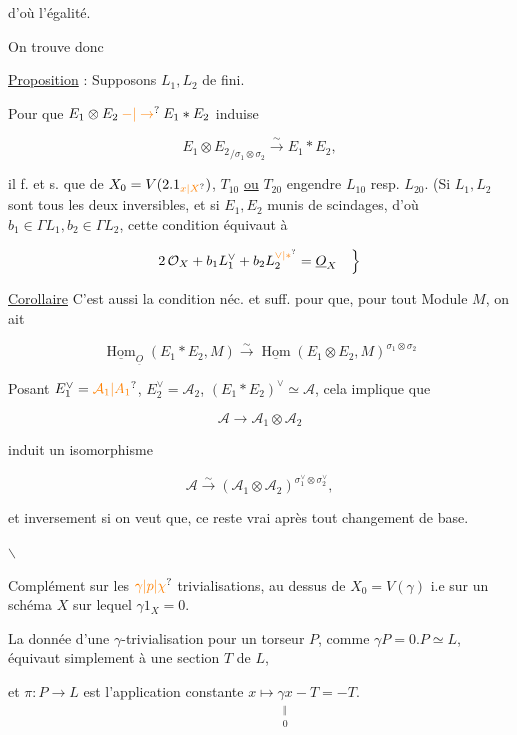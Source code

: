 d'où l'égalité.

On trouve donc

\uline{Proposition} : Supposons  $L_1,L_2$ de   fini.

Pour que $E_1\otimes E_2\mathbin{\unsure{-|\to}}E_1*E_2$ induise

\[ {E_1\otimes E_2}_{/\sigma_1\otimes\sigma_2}\xrightarrow{\sim}E_1*E_2, \]

il f. et s. que    de $X_0=V(2.1_{\unsure{x|X}})$, $T_{10}$ \uline{ou} $T_{20}$ engendre $L_{10}$ resp. $L_{20}$. (Si $L_1,L_2$ sont tous les deux inversibles, et si $E_1,E_2$ munis de scindages, d'où $b_1\in\Gamma L_1,b_2\in\Gamma L_2$, cette condition équivaut à

\[ 2\,\mathcal O_X+b_1L_1^\vee+b_2 L_2^{\unsure{\vee|*}}=\underline O_X\quad\Bigr\} \]


\uline{Corollaire} C'est aussi la condition néc. et suff. pour que, pour tout Module $M$, on ait

\[ \underline{\operatorname{Hom}}_{\underline O}(E_1*E_2,M)\xrightarrow{\sim}\underline{\operatorname{Hom}}(E_1\otimes E_2,M)^{\sigma_1\otimes\sigma_2} \]

Posant $E_1^\vee=\unsure{\mathcal A_1|A_1}$, $E_2^\vee=\mathcal A_2$, $(E_1*E_2)^\vee\simeq\mathcal A$, cela implique que

\[ \mathcal A\longrightarrow\mathcal A_1\otimes\mathcal A_2 \]

induit un isomorphisme

\[ \mathcal A\xrightarrow{\sim}(\mathcal A_1\otimes\mathcal A_2)^{\sigma_1^\vee\otimes\sigma_2^\vee}, \]

et inversement si on veut que, ce  reste vrai après tout changement de base.

\begin{center}$\backslash$\end{center}

Complément sur les $\unsure{\gamma|p|\chi}$ trivialisations, au dessus de $X_0=V(\gamma)$ i.e sur un schéma $X$ sur lequel $\gamma1_X=0$.

La donnée d'une $\gamma$-trivialisation pour un torseur $P$, comme $\gamma P=0.P\simeq L$, équivaut simplement à une section $T$ de $L$,

et $\pi:P\longrightarrow L$ est l'application constante $x\longmapsto\underset{\substack{\Vert\\0}}{\gamma x}-T=-T$.

